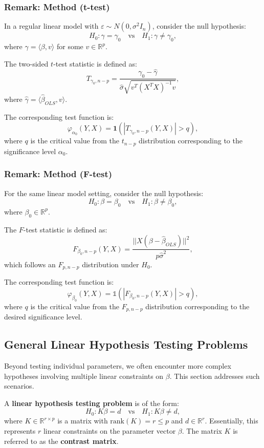\documentclass[open=any, 11pt,paper=A4]{scrreprt}
\begin{document}
\subsubsection*{Remark: Method (t-test)}

In a regular linear model with \(\varepsilon \sim N(0, \sigma^2 I_n)\), consider the null hypothesis:
\[
H_0: \gamma = \gamma_0 \quad \text{vs} \quad H_1: \gamma \neq \gamma_0,
\]
where \(\gamma = \langle \beta, v \rangle\) for some \(v \in \mathbb{R}^p\).

The two-sided \(t\)-test statistic is defined as:
\[
T_{\gamma_0, n - p} = \frac{\gamma_0 - \hat{\gamma}}{\hat{\sigma} \sqrt{v^T (X^TX)^{-1} v}},
\]
where \(\hat{\gamma} = \langle \hat{\beta}_{OLS}, v \rangle\).

The corresponding test function is:
\[
\varphi_{\alpha_0}(Y, X) = \mathbf{1} \left( \left| T_{\gamma_0, n - p}(Y, X) \right| > q \right),
\]
where \(q\) is the critical value from the \(t_{n - p}\) distribution corresponding to the significance level \(\alpha_0\).

\subsubsection*{Remark: Method (F-test)}

For the same linear model setting, consider the null hypothesis:
\[
H_0: \beta = \beta_0 \quad \text{vs} \quad H_1: \beta \neq \beta_0,
\]
where \(\beta_0 \in \mathbb{R}^p\).

The \(F\)-test statistic is defined as:
\[
F_{\beta_0, n - p}(Y, X) = \frac{||X (\beta - \hat{\beta}_{OLS})||^2}{p \hat{\sigma}^2},
\]
which follows an \(F_{p, n - p}\) distribution under \(H_0\).

The corresponding test function is:
\[
\varphi_{\beta_0}(Y, X) = \mathbb{1} \left( |F_{\beta_0, n - p}(Y, X)| > q \right),
\]
where \(q\) is the critical value from the \(F_{p, n - p}\) distribution corresponding to the desired significance level.

\subsection{General Linear Hypothesis Testing Problems}

Beyond testing individual parameters, we often encounter more complex hypotheses involving multiple linear constraints on \(\beta\). This section addresses such scenarios.

\begin{definition}
A \textbf{linear hypothesis testing problem} is of the form:
\[
H_0: K\beta = d \quad \text{vs} \quad H_1: K\beta \neq d,
\]
where \(K \in \mathbb{R}^{r \times p}\) is a matrix with \(\text{rank}(K) = r \le p\) and \(d \in \mathbb{R}^r\). Essentially, this represents \(r\) linear constraints on the parameter vector \(\beta\). The matrix \(K\) is referred to as the \textbf{contrast matrix}.
\end{definition}
\end{document}
